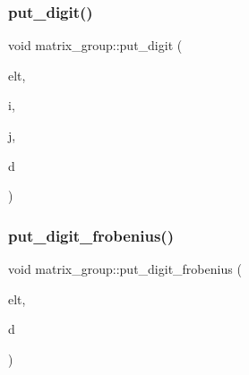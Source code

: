 \mbox{\label{classmatrix__group_aa07f949aaf5a087c4fd021cff839524e}} 
\subsubsection{\texorpdfstring{put\+\_\+digit()}{put\_digit()}}
{\footnotesize\ttfamily void matrix\+\_\+group\+::put\+\_\+digit (\begin{DoxyParamCaption}\item[{\mbox{\hyperlink{galois_8h_a122c4acf389c050379f00341fdcd5812}{U\+B\+Y\+TE}} $\ast$}]{elt,  }\item[{\mbox{\hyperlink{galois_8h_a09fddde158a3a20bd2dcadb609de11dc}{I\+NT}}}]{i,  }\item[{\mbox{\hyperlink{galois_8h_a09fddde158a3a20bd2dcadb609de11dc}{I\+NT}}}]{j,  }\item[{\mbox{\hyperlink{galois_8h_a09fddde158a3a20bd2dcadb609de11dc}{I\+NT}}}]{d }\end{DoxyParamCaption})}

\mbox{\label{classmatrix__group_ab7b1d90899c68cc3bc3ed214a7576153}} 
\subsubsection{\texorpdfstring{put\+\_\+digit\+\_\+frobenius()}{put\_digit\_frobenius()}}
{\footnotesize\ttfamily void matrix\+\_\+group\+::put\+\_\+digit\+\_\+frobenius (\begin{DoxyParamCaption}\item[{\mbox{\hyperlink{galois_8h_a122c4acf389c050379f00341fdcd5812}{U\+B\+Y\+TE}} $\ast$}]{elt,  }\item[{\mbox{\hyperlink{galois_8h_a09fddde158a3a20bd2dcadb609de11dc}{I\+NT}}}]{d }\end{DoxyParamCaption})}

\mbox{\label{classmatrix__group_a9752a39a870f8053562d65f9bac110a0}} 
